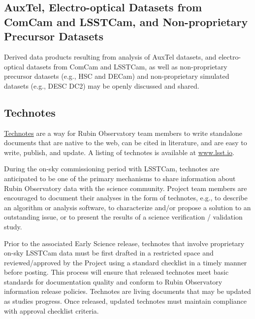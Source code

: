 \documentclass[SE,authoryear,toc,lsstdraft]{lsstdoc}
\begin{document}
\subsection{AuxTel, Electro-optical Datasets from ComCam and LSSTCam, and Non-proprietary Precursor Datasets}

Derived data products resulting from analysis of AuxTel datasets, and electro-optical datasets from ComCam and LSSTCam, as well as non-proprietary precursor datasets (e.g., HSC and DECam) and non-proprietary simulated datasets (e.g., DESC DC2) may be openly discussed and shared.



\subsection{Technotes}
\label{technotes}

\href{https://developer.lsst.io/project-docs/technotes.html}{Technotes} are a way for Rubin Observatory team members to write standalone documents that are native to the web, can be cited in literature, and are easy to write, publish, and update.
A listing of technotes is available at \url{www.lsst.io}.

During the on-sky commissioning period with LSSTCam, technotes are anticipated to be one of the primary mechanisms to share information about Rubin Observatory data with the science community.
Project team members are encouraged to document their analyses in the form of technotes, e.g., to describe an algorithm or analysis software, to characterize and/or propose a solution to an outstanding issue, or to present the results of a science verification / validation study.

Prior to the associated Early Science release, technotes that involve proprietary on-sky LSSTCam data must be first drafted in a restricted space and reviewed/approved by the Project using a standard checklist in a timely manner before posting.
This process will ensure that released technotes meet basic standards for documentation quality and conform to Rubin Observatory information release policies.
Technotes are living documents that may be updated as studies progress.
Once released, updated technotes must maintain compliance with approval checklist criteria.
\end{document}
